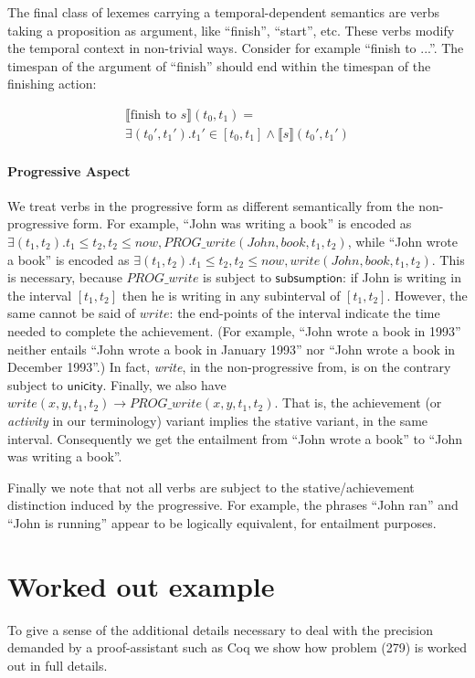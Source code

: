 \documentclass[a4paper,11pt]{article}
\newcommand\constant[1]{\mathsf{#1}}
\begin{document}
The final class of lexemes carrying a temporal-dependent semantics are
verbs taking a proposition as argument, like ``finish'', ``start'',
etc. These verbs modify the temporal context in non-trivial
ways. Consider for example ``finish to ...''. The timespan of the
argument of ``finish'' should end within the timespan of the finishing
action:

\begin{multline*}
⟦\text{finish to \(s\)}⟧(t_0,t_1) = \\ ∃(t_0',t_1'). t_1' ∈ [t_0,t_1] ∧ ⟦s⟧(t_0',t_1')
\end{multline*}

\paragraph{Progressive Aspect}

We treat verbs in the progressive form as different semantically from
the non-progressive form. For example, ``John was writing a book'' is
encoded as
$∃(t_1, t_2). t_1≤ t_2, t_2 ≤ now, PROG\_write(John,book,t_1,t_2)$,
while ``John wrote a book'' is encoded as
$∃(t_1, t_2). t_1≤ t_2, t_2 ≤ now, write(John,book,t_1,t_2)$. This is
necessary, because $PROG\_write$ is subject to
$\constant{subsumption}$: if John is writing in the interval
$[t_1,t_2]$ then he is writing in any subinterval of
$[t_1,t_2]$. However, the same cannot be said of $write$: the
end-points of the interval indicate the time needed to complete the
achievement. (For example, ``John wrote a book in 1993'' neither
entails ``John wrote a book in January 1993'' nor ``John wrote a book
in December 1993''.) In fact, \emph{write}, in the non-progressive
from, is on the contrary subject to $\constant{unicity}$. Finally, we
also have $write(x,y,t_1,t_2) → PROG\_write(x,y,t_1,t_2)$. That is,
the achievement (or \emph{activity} in our terminology) variant implies the stative variant, in the
same interval.  Consequently we get the entailment from ``John wrote a
book'' to ``John was writing a book''.

Finally we note that not all verbs are subject to the
stative/achievement distinction induced by the progressive. For
example, the phrases ``John ran'' and ``John is running'' appear to be
logically equivalent, for entailment purposes.


\section{Worked out example}
To give a sense of the additional details necessary to deal with the
precision demanded by a proof-assistant such as Coq we show how
problem (279) is worked out in full details.
\end{document}
